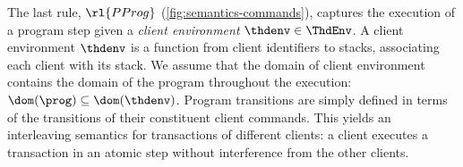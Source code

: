 The last rule, \( \rl{PProg} \) (\cref{fig:semantics-commands}),
captures the execution of a program step 
given a \emph{client environment} $\thdenv \in \ThdEnv$.
A client environment $\thdenv$ is a function from client identifiers to stacks, associating each client with its stack. 
We assume that the domain of client environment contains 
the domain of the program throughout the execution: 
$\dom(\prog) \subseteq \dom(\thdenv)$.
Program transitions are simply defined in terms of the transitions of
their constituent client commands. 
This yields an interleaving semantics for transactions of different clients:  
a client executes a transaction in an atomic step without
interference from the  other clients. 
